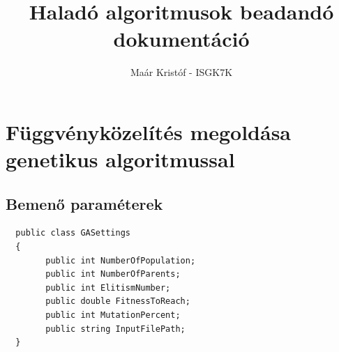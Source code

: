 \documentclass{article}
\date{\vspace{-7ex}}
\title{Haladó algoritmusok beadandó dokumentáció}
\author{Maár Kristóf - ISGK7K}
\begin{document}
\maketitle
\noindent

\section{Függvényközelítés megoldása genetikus algoritmussal}
\subsection{Bemenő paraméterek}

\begin{lstlisting}
  public class GASettings
  {
        public int NumberOfPopulation;
        public int NumberOfParents;
        public int ElitismNumber;
        public double FitnessToReach;
        public int MutationPercent;
        public string InputFilePath;
  }
\end{lstlisting}
\end{document}
